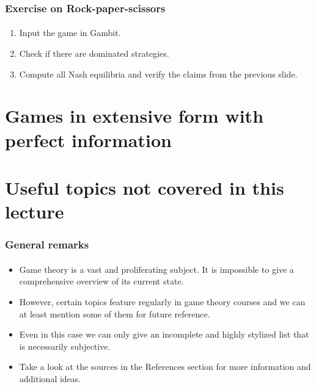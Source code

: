 \documentclass[10pt]{beamer}
\theoremstyle{definition}
\begin{document}
\begin{frame}[fragile]
\frametitle{Exercise on Rock-paper-scissors}
\framesubtitle{}
\begin{enumerate}\itemsep1em
\item Input the game in Gambit.
\item Check if there are dominated strategies.
\item Compute all Nash equilibria and verify the claims from the previous slide.
\end{enumerate}
\end{frame}



\section{Games in extensive form with perfect information}


\section{Useful topics not covered in this lecture}

\begin{frame}[fragile]
\frametitle{General remarks}
\framesubtitle{}
\begin{itemize}\itemsep1em
\item Game theory is a vast and proliferating subject. It is impossible to give a comprehensive overview of its current state.
\item However, certain topics feature regularly in game theory courses and we can at least mention some of them for future reference.
\item Even in this case we can only give an incomplete and highly stylized list that is necessarily subjective.
\item Take a look at the sources in the References section for more information and additional ideas.
\end{itemize}
\end{frame}
\end{document}
